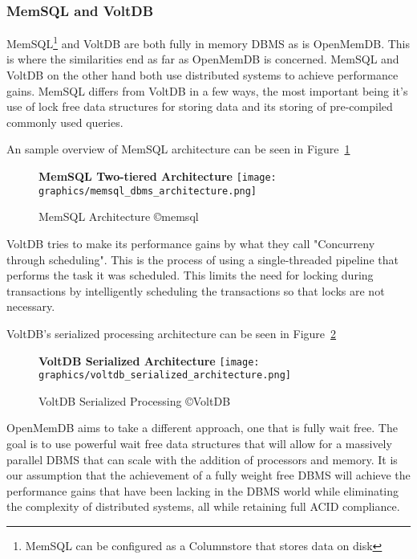 \documentclass[letterpaper, 12pt]{article}
\begin{document}
\subsubsection{MemSQL and VoltDB}
MemSQL\footnote{MemSQL can be configured as a Columnstore that stores data on disk}
and VoltDB are both fully in memory DBMS as is OpenMemDB. This is where the
similarities end as far as OpenMemDB is concerned. MemSQL and VoltDB on the other
hand both use distributed systems to achieve performance gains. MemSQL differs from
VoltDB in a few ways, the most important being it's use of lock free data structures
for storing data and its storing of pre-compiled commonly used queries\cite{MemSQL}.
\par\vspace{\baselineskip}
An sample overview of MemSQL architecture can be seen in Figure~\ref{fig:memsql_architecture}
\begin{figure}
  \centering
  \label{fig:memsql_architecture}
  \textbf{MemSQL Two-tiered Architecture}
  \texttt{[image: graphics/memsql\_dbms\_architecture.png]}
  \caption{MemSQL Architecture \copyright memsql \cite{MemSQL}}
\end{figure}
VoltDB tries to make its performance gains by what they call "Concurreny through
scheduling"\cite{VoltDB}. This is the process of using a single-threaded pipeline
that performs the task it was scheduled. This limits the need for locking during
transactions by intelligently scheduling the transactions so that locks are not
necessary.
\par\vspace{\baselineskip}
VoltDB's serialized processing architecture can be seen in Figure~\ref{fig:voltdb_serialized}
\begin{figure}
  \centering
  \label{fig:voltdb_serialized}
  \textbf{VoltDB Serialized Architecture}
  \texttt{[image: graphics/voltdb\_serialized\_architecture.png]}
  \caption{VoltDB Serialized Processing \copyright VoltDB \cite{VoltDB}}
\end{figure}
\par\vspace{\baselineskip}
OpenMemDB aims to take a different approach, one that is fully wait free. The goal is
to use powerful wait free data structures that will allow for a massively parallel
DBMS that can scale with the addition of processors and memory. It is our assumption
that the achievement of a fully weight free DBMS will achieve the performance gains
that have been lacking in the DBMS world while eliminating the complexity of
distributed systems, all while retaining full ACID compliance.
\end{document}
